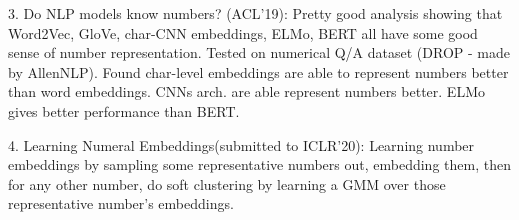 3.      Do NLP models know numbers? (ACL'19): Pretty good analysis showing that Word2Vec, GloVe, char-CNN embeddings, ELMo, BERT all have some good sense of number representation. Tested on numerical Q/A dataset (DROP - made by AllenNLP). Found char-level embeddings are able to represent numbers better than word embeddings. CNNs arch. are able represent numbers better. ELMo gives better performance than BERT.
 
4.      Learning Numeral Embeddings(submitted to ICLR'20): Learning number embeddings by sampling some representative numbers out, embedding them, then for any other number, do soft clustering by learning a GMM over those representative number's embeddings.


